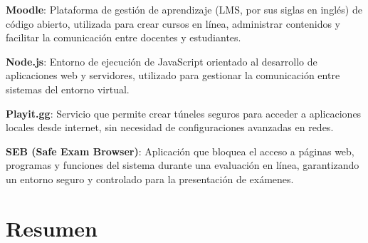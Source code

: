 \documentclass[letter,oneside,12pt,spanish]{report}
\begin{document}
\begin{description}
\item \textbf{Moodle}: Plataforma de gestión de aprendizaje (LMS, por sus siglas en inglés) de código abierto, utilizada para crear cursos en línea, administrar contenidos y facilitar la comunicación entre docentes y estudiantes.
\item \textbf{Node.js}: Entorno de ejecución de JavaScript orientado al desarrollo de aplicaciones web y servidores, utilizado para gestionar la comunicación entre sistemas del entorno virtual.
\item \textbf{Playit.gg}: Servicio que permite crear túneles seguros para acceder a aplicaciones locales desde internet, sin necesidad de configuraciones avanzadas en redes.
\item \textbf{SEB (Safe Exam Browser)}: Aplicación que bloquea el acceso a páginas web, programas y funciones del sistema durante una evaluación en línea, garantizando un entorno seguro y controlado para la presentación de exámenes.
\end{description}


\newpage

\newpage

\chapter*{Resumen}
\end{document}
